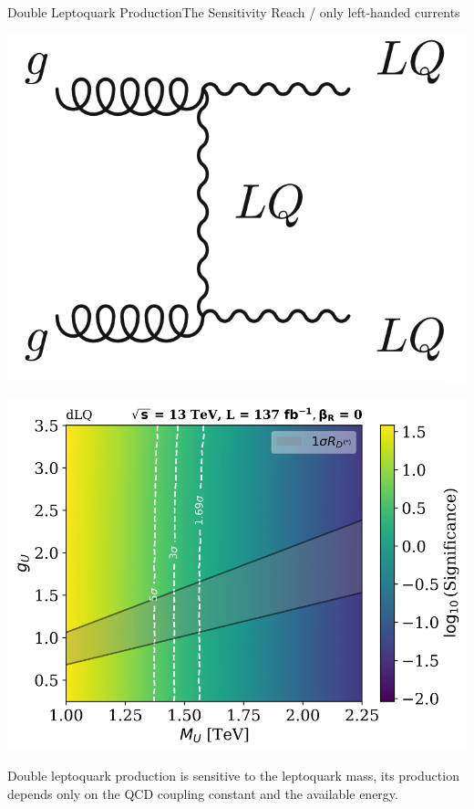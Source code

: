 \documentclass{bredelebeamer}
\begin{document}
\begin{frame}{Double Leptoquark Production}{The Sensitivity Reach / only left-handed currents}
	\begin{minipage}{.30\linewidth}
		\includegraphics[width=\linewidth]{double_LQ.png}
	\end{minipage}
	\begin{minipage}{.68\linewidth}
		\includegraphics[width=\linewidth]{Significance_Heatmap_13TeV_L137_dLQ_combined_woRHC.pdf}
	\end{minipage}
	{\large
	  Double leptoquark production is sensitive to the leptoquark mass, its production depends only on the QCD coupling constant and the available energy.
	}
\end{frame}
\end{document}
